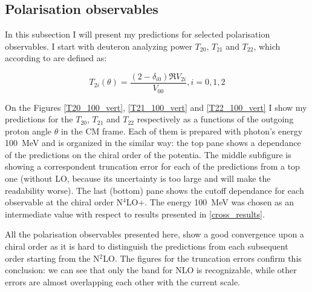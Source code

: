     \clearpage

    \subsection{Polarisation observables}
    \label{tensor_results}

    In this subsection I will present my predictions for 
    selected polarisation observables.
    I start with deuteron analyzing power $T_{20}$, $T_{21}$ and $T_{22}$,
    which according to \cite{ArenhovelPhotodisint1991} are defined as:
    
    \begin{equation}
        T_{2i} (\theta) = \frac{(2 - \delta_{i0}) \Re V_{2i}}{V_{00}}, i=0,1,2
    \end{equation}

    On the Figures \ref{T20_100_vert}, \ref{T21_100_vert} and 
    \ref{T22_100_vert} I show my predictions for the
    $T_{20}$, $T_{21}$ and $T_{22}$ respectively as a functions 
    of the outgoing proton angle $\theta$ in the CM frame. Each of them
    is prepared with photon's energy 100~MeV and is
    organized in the similar way: the top
    pane shows a dependance of the predictions on the 
    chiral order of the potentia. The middle subfigure is
    showing a correspondent truncation error for each of the 
    predictions from a top one (without LO, because its uncertainty is
    too large and will make the readability worse). The last (bottom)
    pane shows the cutoff dependance for each observable at the chiral
    order N$^4$LO+. The energy 100~MeV was chosen as 
    an intermediate value with respect to results presented in \ref{cross_results}.

    All the polarisation observables presented here, show a good convergence 
    upon a chiral order as it is hard to distinguish the predictions
    from each subsequent order starting from the N$^2$LO. The figures 
    for the truncation errors confirm this conclusion: we can see that only the band
    for NLO is recognizable, while other errors are almost overlapping 
    each other with the current scale. 

